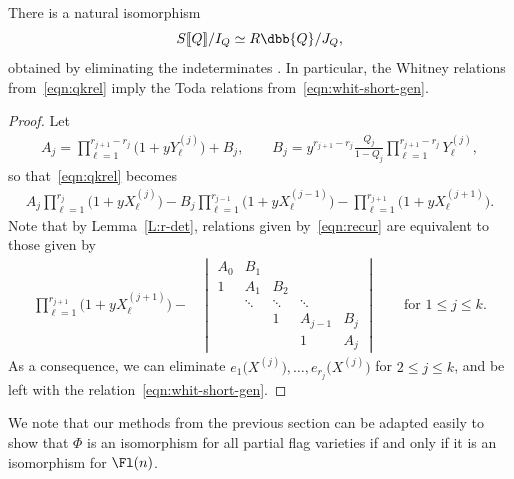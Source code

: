  \begin{Proposition}\label{prop:whit-toda}
 There is a natural isomorphism
 \[ S[\![Q]\!]/I_Q \simeq R\dbb{Q}/J_Q ,\]
 obtained by eliminating the indeterminates . In particular,
 the Whitney relations from~\eqref{eqn:qkrel} imply the
 Toda relations from~\eqref{eqn:whit-short-gen}.
 \end{Proposition}
 \begin{proof}
 Let
 \begin{align*}
 A_j=\prod_{\ell=1}^{r_{j+1}-r_j}\bigl(1+y Y^{(j)}_\ell\bigr)+B_j,\qquad B_j=y^{{r_{j+1}-r_j}}\frac{Q_j}{1-Q_j}\prod_{\ell=1}^{r_{j+1}-r_j}Y^{(j)}_\ell,
 \end{align*}
 so that~\eqref{eqn:qkrel} becomes
 \begin{align}\label{eqn:recur}
 A_j\prod_{\ell=1}^{r_j}\bigl(1+yX^{(j)}_\ell\bigr) -B_j\prod_{\ell=1}^{r_{j-1}}\bigl(1+yX^{(j-1)}_\ell\bigr) -\prod_{\ell=1}^{r_{j+1}}\bigl(1+y X^{(j+1)}_\ell\bigr).
 \end{align}
 Note that by Lemma~\ref{L:r-det}, relations given by~\eqref{eqn:recur} are equivalent to those given by
 \begin{align*}%
 \prod_{\ell=1}^{r_{j+1}}\bigl(1+y X^{(j+1)}_\ell\bigr)-
 &\begin{vmatrix}
 A_0 & B_1 & & & \\
 1 & A_1 & B_2 & & \\ & \ddots & \ddots & \ddots & \\ & & 1 & A_{j-1} & B_{j}\\ & & & 1 & A_{j}
 \end{vmatrix}\qquad \text{for $1\leq j\leq k$}.
 \end{align*}
 As a consequence, we can eliminate $e_1\bigl(X^{(j)}\bigr),\dots, e_{r_j}\bigl(X^{(j)}\bigr)$ for $2\leq j\leq k$, and be left with the relation~\eqref{eqn:whit-short-gen}.
 \end{proof}
\begin{Remark}\label{rmk:QKW} We note that our methods from the previous section can be adapted easily to show that $\Phi$ is an isomorphism for all partial flag varieties if and only if it is an isomorphism for $\Fl(n)$. \end{Remark}
